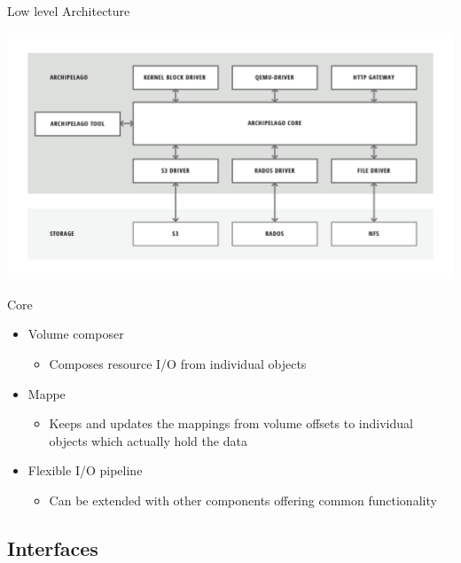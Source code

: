 \documentclass[utf8]{beamer}
\begin{document}
\begin{frame}{Low level Architecture}
  \begin{center}
    \includegraphics[width=.90\linewidth]{figures/low-architecture.png}
  \end{center}
\end{frame}

\begin{frame}{Core}
  \begin{itemize}
    \item Volume composer
      \begin{itemize}
      \item Composes resource I/O from individual objects
      \end{itemize}
    \item Mappe
      \begin{itemize}
      \item Keeps and updates the mappings from volume offsets to
        individual objects which actually hold the data
      \end{itemize}
    \item Flexible I/O pipeline
      \begin{itemize}
      \item Can be extended with other components offering common
        functionality
      \end{itemize}
  \end{itemize}
\end{frame}

\subsection{Interfaces}
\end{document}
